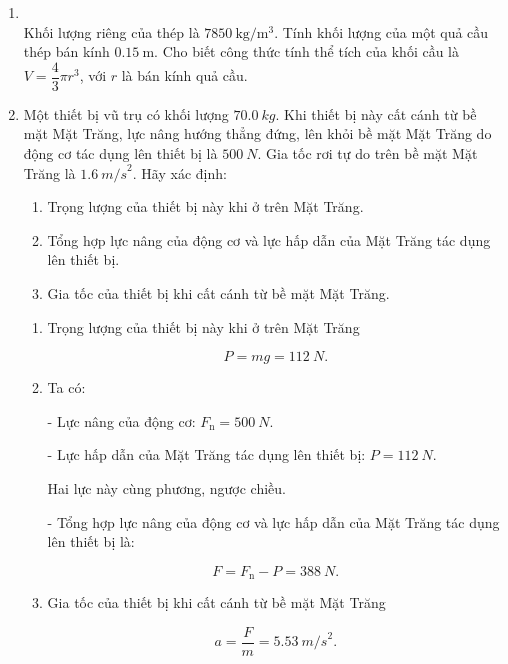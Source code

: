 \begin{enumerate}[label=\bfseries Bài \arabic*:,leftmargin=1.5cm]
\item {}\\
Khối lượng riêng của thép là $\SI{7850}{\kilogram/\meter^3}$. Tính khối lượng của một quả cầu thép bán kính $\SI{0.15}{\meter}$. Cho biết công thức tính thể tích của khối cầu là $V=\dfrac{4}{3}\pi r^3$, với $r$ là bán kính quả cầu.

\item {}


{
	Một thiết bị vũ trụ có khối lượng $\SI{70,0}{kg}$. Khi thiết bị này cất cánh từ bề mặt Mặt Trăng, lực nâng hướng thẳng đứng, lên khỏi bề mặt Mặt Trăng do động cơ tác dụng lên thiết bị là $\SI{500}{N}$. Gia tốc rơi tự do trên bề mặt Mặt Trăng là $\SI{1,6}{m/s}^2$. Hãy xác định:
	\begin{enumerate}[label=\alph*)]
		\item  Trọng lượng của thiết bị này khi ở trên Mặt Trăng.
		
		\item Tổng hợp lực nâng của động cơ và lực hấp dẫn của Mặt Trăng tác dụng lên thiết bị.
		
		\item Gia tốc của thiết bị khi cất cánh từ bề mặt Mặt Trăng.
		
	\end{enumerate}
}

\hideall
{
	\begin{enumerate}[label=\alph*)]
		\item  Trọng lượng của thiết bị này khi ở trên Mặt Trăng
		
		$$P = mg = \SI{112}{N}.$$
		
		\item Ta có:
		
		- Lực nâng của động cơ: $F_\text{n} = \SI{500}{N}.$
		
		- Lực hấp dẫn của Mặt Trăng tác dụng lên thiết bị: $P = \SI{112}{N}.$
		
		Hai lực này cùng phương, ngược chiều.
		
		- Tổng hợp lực nâng của động cơ và lực hấp dẫn của Mặt Trăng tác dụng lên thiết bị là:
		
		$$F = F_\text{n} - P = \SI{388}{N}.$$
		
		\item Gia tốc của thiết bị khi cất cánh từ bề mặt Mặt Trăng
		
		$$a = \dfrac{F}{m} = \SI{5,53}{m/s}^2.$$
		

\end{enumerate}}
\end{enumerate}

